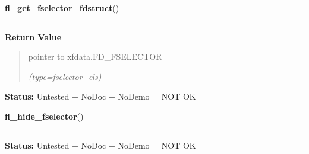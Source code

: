     \vspace{0.5ex}

\hspace{.8\funcindent}\begin{boxedminipage}{\funcwidth}

    \raggedright \textbf{fl\_get\_fselector\_fdstruct}()

    \vspace{-1.5ex}

    \rule{\textwidth}{0.5\fboxrule}
\setlength{\parskip}{2ex}
\setlength{\parskip}{1ex}
      \textbf{Return Value}
    \vspace{-1ex}

      \begin{quote}
      pointer to xfdata.FD\_FSELECTOR

      {\it (type=fselector\_cls)}

      \end{quote}

\textbf{Status:} Untested + NoDoc + NoDemo = NOT OK



    \end{boxedminipage}

    \label{xformslib:flgoodies:fl_hide_fselector}

    \vspace{0.5ex}

\hspace{.8\funcindent}\begin{boxedminipage}{\funcwidth}

    \raggedright \textbf{fl\_hide\_fselector}()

    \vspace{-1.5ex}

    \rule{\textwidth}{0.5\fboxrule}
\setlength{\parskip}{2ex}
\setlength{\parskip}{1ex}
\textbf{Status:} Untested + NoDoc + NoDemo = NOT OK



    \end{boxedminipage}

    \label{xformslib:flgoodies:fl_set_fselector_filetype_marker}

    \vspace{0.5ex}

